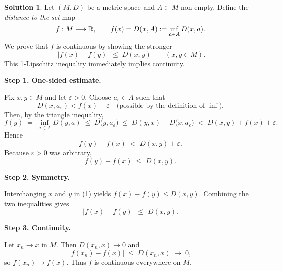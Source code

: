 \documentclass[12pt]{article}
\theoremstyle{definition} %
\newtheorem{solution}{Solution}
\theoremstyle{plain} %
\begin{document}
    \begin{solution}
      Let \((M,D)\) be a metric space and \(A\subset M\) non-empty.
      Define the \emph{distance-to-the-set} map
      \[
         f:M\longrightarrow\Bbb R,\qquad
         f(x)=D(x,A):=\inf_{a\in A} D(x,a).
      \]
      We prove that \(f\) is continuous by showing the stronger
      \[
         \boxed{\;|f(x)-f(y)|\;\le\;D(x,y)\qquad(x,y\in M).}
      \]
      This 1-Lipschitz inequality immediately implies continuity.
      
      \bigskip
      \textbf{Step 1.  One-sided estimate.}
      
      Fix \(x,y\in M\) and let \(\varepsilon>0\).
      Choose \(a_{\varepsilon}\in A\) such that
      \[
         D(x,a_{\varepsilon})<f(x)+\varepsilon
         \quad\bigl(\text{possible by the definition of }\inf\bigr).
      \]
      Then, by the triangle inequality,
      \[
         f(y)
         \;=\;
         \inf_{a\in A} D(y,a)
         \;\le\;
         D\bigl(y,a_{\varepsilon}\bigr)
         \;\le\;
         D(y,x)+D\bigl(x,a_{\varepsilon}\bigr)
         \;<\;
         D(x,y)+f(x)+\varepsilon .
      \]
      Hence
      \[
         f(y)-f(x)\;<\;D(x,y)+\varepsilon.
      \]
      Because \(\varepsilon>0\) was arbitrary,
      \[
         f(y)-f(x)\;\le\;D(x,y). \tag{1}
      \]
      
      \bigskip
      \textbf{Step 2.  Symmetry.}
      
      Interchanging \(x\) and \(y\) in (1) yields
      \(f(x)-f(y)\le D(x,y)\).
      Combining the two inequalities gives
      \[
         |f(x)-f(y)|\;\le\;D(x,y).
      \]
      
      \bigskip
      \textbf{Step 3.  Continuity.}
      
      Let \(x_{n}\to x\) in \(M\).
      Then \(D(x_{n},x)\to0\) and
      \[
         |f(x_{n})-f(x)|\;\le\;D(x_{n},x)\;\longrightarrow\;0,
      \]
      so \(f(x_{n})\to f(x)\).
      Thus \(f\) is continuous everywhere on \(M\).
      \end{solution} 
\end{document}
